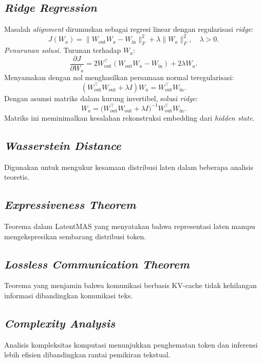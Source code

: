 \subsection{\textit{Ridge Regression}}
Masalah \textit{alignment} dirumuskan sebagai regresi linear dengan regularisasi \textit{ridge}:
\begin{equation}
J(W_a) = \| W_{\mathrm{out}} W_a - W_{\mathrm{in}} \|_F^2 + \lambda \|W_a\|_F^2, \quad \lambda>0.
\tag{2.4}
\end{equation}
\textit{Penurunan solusi.} Turunan terhadap \(W_a\):
\begin{equation}
\frac{\partial J}{\partial W_a} = 2W_{\mathrm{out}}^\top (W_{\mathrm{out}} W_a - W_{\mathrm{in}}) + 2\lambda W_a.
\end{equation}
Menyamakan dengan nol menghasilkan persamaan normal teregularisasi:
\begin{equation}
(W_{\mathrm{out}}^\top W_{\mathrm{out}} + \lambda I) W_a = W_{\mathrm{out}}^\top W_{\mathrm{in}}.
\end{equation}
Dengan asumsi matriks dalam kurung invertibel, solusi \textit{ridge}:
\begin{equation}
\boxed{ W_a = \big( W_{\mathrm{out}}^\top W_{\mathrm{out}} + \lambda I \big)^{-1} W_{\mathrm{out}}^\top W_{\mathrm{in}} }.
\tag{2.5}
\end{equation}
Matriks ini meminimalkan kesalahan rekonstruksi embedding dari \textit{hidden state}.

\subsection{\textit{Wasserstein Distance}}
Digunakan untuk mengukur kesamaan distribusi laten dalam beberapa analisis teoretis.

\subsection{\textit{Expressiveness Theorem}}
Teorema dalam LatentMAS yang menyatakan bahwa representasi laten mampu mengekspresikan sembarang distribusi token.

\subsection{\textit{Lossless Communication Theorem}}
Teorema yang menjamin bahwa komunikasi berbasis KV-cache tidak kehilangan informasi dibandingkan komunikasi teks.

\subsection{\textit{Complexity Analysis}}
Analisis kompleksitas komputasi menunjukkan penghematan token dan inferensi lebih efisien dibandingkan rantai pemikiran tekstual.

